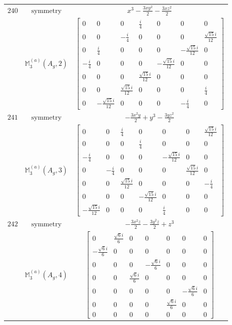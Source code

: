 \documentclass[fleqn,8pt,landscape]{jsarticle}
\begin{document}
\begin{longtable}{ccc}
$ 240 $ & $ \text{symmetry} $ & $ x^{3} - \frac{3 x y^{2}}{2} - \frac{3 x z^{2}}{2} $ \\
$  $ & $ \mathbb{M}_{3}^{(a)}(A_{g},2) $ & $ \begin{bmatrix} 0 & 0 & 0 & \frac{i}{4} & 0 & 0 & 0 \\ 0 & 0 & - \frac{i}{4} & 0 & 0 & 0 & \frac{\sqrt{15} i}{12} \\ 0 & \frac{i}{4} & 0 & 0 & 0 & - \frac{\sqrt{15} i}{12} & 0 \\ - \frac{i}{4} & 0 & 0 & 0 & - \frac{\sqrt{15} i}{12} & 0 & 0 \\ 0 & 0 & 0 & \frac{\sqrt{15} i}{12} & 0 & 0 & 0 \\ 0 & 0 & \frac{\sqrt{15} i}{12} & 0 & 0 & 0 & \frac{i}{4} \\ 0 & - \frac{\sqrt{15} i}{12} & 0 & 0 & 0 & - \frac{i}{4} & 0 \end{bmatrix} $ \\ \hline
$ 241 $ & $ \text{symmetry} $ & $ - \frac{3 x^{2} y}{2} + y^{3} - \frac{3 y z^{2}}{2} $ \\
$  $ & $ \mathbb{M}_{3}^{(a)}(A_{g},3) $ & $ \begin{bmatrix} 0 & 0 & \frac{i}{4} & 0 & 0 & 0 & \frac{\sqrt{15} i}{12} \\ 0 & 0 & 0 & \frac{i}{4} & 0 & 0 & 0 \\ - \frac{i}{4} & 0 & 0 & 0 & - \frac{\sqrt{15} i}{12} & 0 & 0 \\ 0 & - \frac{i}{4} & 0 & 0 & 0 & \frac{\sqrt{15} i}{12} & 0 \\ 0 & 0 & \frac{\sqrt{15} i}{12} & 0 & 0 & 0 & - \frac{i}{4} \\ 0 & 0 & 0 & - \frac{\sqrt{15} i}{12} & 0 & 0 & 0 \\ - \frac{\sqrt{15} i}{12} & 0 & 0 & 0 & \frac{i}{4} & 0 & 0 \end{bmatrix} $ \\ \hline
$ 242 $ & $ \text{symmetry} $ & $ - \frac{3 x^{2} z}{2} - \frac{3 y^{2} z}{2} + z^{3} $ \\
$  $ & $ \mathbb{M}_{3}^{(a)}(A_{g},4) $ & $ \begin{bmatrix} 0 & \frac{\sqrt{6} i}{6} & 0 & 0 & 0 & 0 & 0 \\ - \frac{\sqrt{6} i}{6} & 0 & 0 & 0 & 0 & 0 & 0 \\ 0 & 0 & 0 & - \frac{\sqrt{6} i}{6} & 0 & 0 & 0 \\ 0 & 0 & \frac{\sqrt{6} i}{6} & 0 & 0 & 0 & 0 \\ 0 & 0 & 0 & 0 & 0 & - \frac{\sqrt{6} i}{6} & 0 \\ 0 & 0 & 0 & 0 & \frac{\sqrt{6} i}{6} & 0 & 0 \\ 0 & 0 & 0 & 0 & 0 & 0 & 0 \end{bmatrix} $ \\ \hline

\end{longtable}
\end{document}
